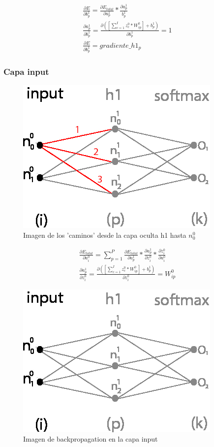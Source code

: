 \begin{gather}
	\frac{\partial E}{\partial b^1_p} = \frac{\partial E_{total} }{\partial a^1_p } * \frac{\partial a^1_p}{b^1_p} \\
	\frac{\partial a^1_p }{\partial b^1_p } = \frac{\partial ([\sum_{c=1}^{I} z^0_c * W^0_{ip}] + b^1_p) }{\partial b^1_p } = 1 \\
	\frac{\partial E}{\partial b^1_p} = gradiente\_h1_p
	\label{grad_b1p}
\end{gather}

\subsubsection{Capa input}

\begin{figure}[H]
	\centering
	\includegraphics[scale=0.35]{imagenes/nn_caminos_posibles_input.jpg}  
	\caption{Imagen de los 'caminos' desde la capa oculta h1 hasta $n^0_0$}
	\label{nn_caminos_posibles_input}
\end{figure}

\begin{gather}
	\frac{\partial E_{total}}{\partial a^0_i} = \sum_{p=1}^P \frac{\partial E_{total}}{\partial a^1_p} * \frac{\partial a^1_p}{\partial z^0_i} * \frac{\partial z^0_i}{\partial a^0_i} \\
	\frac{\partial a^1_p }{\partial z^0_i } = \frac{\partial ([\sum_{c=1}^{I} z^0_c * W^0_{ip}] + b^1_p) }{\partial z^0_i } = W^0_{ip}
\end{gather}

\begin{figure}[H]
	\centering
	\includegraphics[scale=0.35]{imagenes/nn_1_capa_input.jpg}  
	\caption{Imagen de backpropagation en la capa input}
	\label{fig:nn_1_capa_input}
\end{figure}

